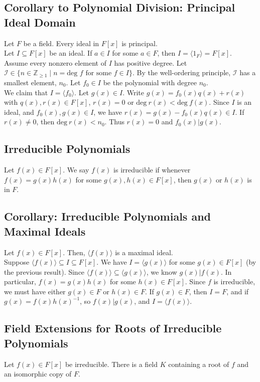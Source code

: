\documentclass[10pt]{extarticle}
\newcommand{\Z}{\mathbb{Z}}
\begin{document}
  \subsection{Corollary to Polynomial Division: Principal Ideal Domain}%
  Let $F$ be a field. Every ideal in $F[x]$ is principal.\\

  Let $I\subseteq F[x]$ be an ideal. If $a\in I$ for some $a\in F$, then $I = \langle 1_F\rangle = F[x]$. Assume every nonzero element of $I$ has positive degree. Let $\mathcal{I}\in \{n\in \Z_{\geq 1}\mid n = \text{deg $f$ for some $f\in I$}\}$. By the well-ordering principle, $\mathcal{I}$ has a smallest element, $n_0$. Let $f_0\in I$ be the polynomial with degree $n_0$.\\

  We claim that $I = \langle f_0 \rangle$. Let $g(x)\in I$. Write $g(x) = f_0(x)q(x) + r(x)$ with $q(x),r(x)\in F[x]$, $r(x) = 0$ or $\text{deg}~r(x) < \text{deg}~f(x)$. Since $I$ is an ideal, and $f_0(x),g(x)\in I$, we have $r(x) = g(x)-f_0(x)q(x)\in I$. If $r(x) \neq 0$, then $\text{deg}~r(x) < n_0$. Thus $r(x) = 0$ and $f_0(x) | g(x)$.
  \subsection{Irreducible Polynomials}%
  Let $f(x) \in F[x]$. We say $f(x)$ is irreducible if whenever $f(x) = g(x)h(x)$ for some $g(x),h(x)\in F[x]$, then $g(x)$ or $h(x)$ is in $F$. 
  \subsection{Corollary: Irreducible Polynomials and Maximal Ideals}%
  Let $f(x) \in F[x]$. Then, $\langle f(x) \rangle$ is a maximal ideal.\\

  Suppose $\langle f(x) \rangle\subseteq I\subseteq F[x]$. We have $I = \langle g(x)\rangle$ for some $g(x)\in F[x]$ (by the previous result). Since $\langle f(x)\rangle \subseteq \langle g(x)\rangle$, we know $g(x)|f(x)$. In particular, $f(x) = g(x)h(x)$ for some $h(x)\in F[x]$. Since $f$ is irreducible, we must have either $g(x)\in F$ or $h(x)\in F$. If $g(x)\in F$, then $I = F$, and if $g(x) = f(x)h(x)^{-1}$, so $f(x)|g(x)$, and $I = \langle f(x)\rangle$.
  \subsection{Field Extensions for Roots of Irreducible Polynomials}%
  Let $f(x) \in F[x]$ be irreducible. There is a field $K$ containing a root of $f$ and an isomorphic copy of $F$.\\
\end{document}
